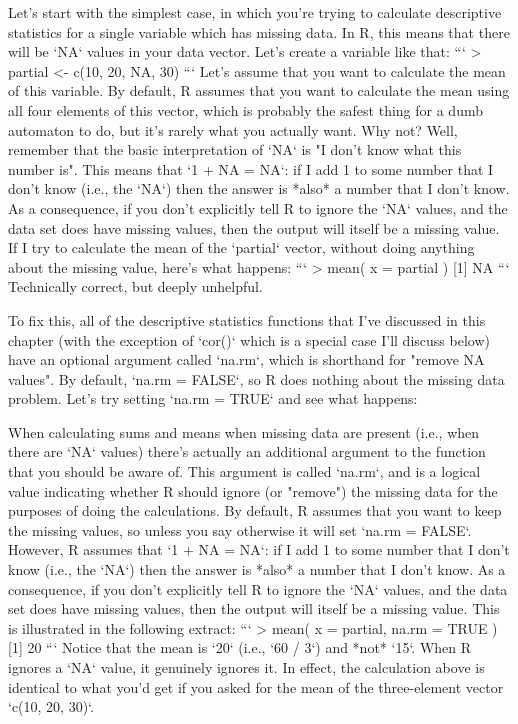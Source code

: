Let's start with the simplest case, in which you're trying to calculate descriptive statistics for a single variable which has missing data. In R, this means that there will be `NA` values in your data vector. Let's create a variable like that:
```
> partial <- c(10, 20, NA, 30)
```
Let's assume that you want to calculate the mean of this variable. By default, R assumes that you want to calculate the mean using all four elements of this vector, which is probably the safest thing for a dumb automaton to do, but it's rarely what you actually want. Why not? Well, remember that the basic interpretation of `NA` is "I don't know what this number is". This means that `1 + NA = NA`: if I add 1 to some number that I don't know (i.e., the `NA`) then the answer is *also* a number that I don't know. As a consequence, if you don't explicitly tell R to ignore the `NA` values, and the data set does have missing values, then the output will itself be a missing value. If I try to calculate the mean of the `partial` vector, without doing anything about the missing value, here's what happens:
```
> mean( x = partial )
[1] NA
```
Technically correct, but deeply unhelpful. 

To fix this, all of the descriptive statistics functions that I've discussed in this chapter (with the exception of `cor()` which is a special case I'll discuss below) have an optional argument called `na.rm`, which is shorthand for "remove NA values". By default, `na.rm = FALSE`, so R does nothing about the missing data problem. Let's try setting `na.rm = TRUE` and see what happens:

When calculating sums and means when missing data are present (i.e., when there are `NA` values) there's actually an additional argument to the function that you should be aware of. This argument is called `na.rm`, and is a logical value indicating whether R should ignore (or "remove") the missing data for the purposes of doing the calculations. By default, R assumes that you want to keep the missing values, so unless you say otherwise it will set `na.rm = FALSE`. However, R assumes that `1 + NA = NA`: if I add 1 to some number that I don't know (i.e., the `NA`) then the answer is *also* a number that I don't know. As a consequence, if you don't explicitly tell R to ignore the `NA` values, and the data set does have missing values, then the output will itself be a missing value. This is illustrated in the following extract:
```
> mean( x = partial, na.rm = TRUE )
[1] 20
```
Notice that the mean is `20`  (i.e., `60 / 3`) and *not* `15`. When R ignores a `NA` value, it genuinely ignores it. In effect, the calculation above is identical to what you'd get if you asked for the mean of the three-element vector `c(10, 20, 30)`.

